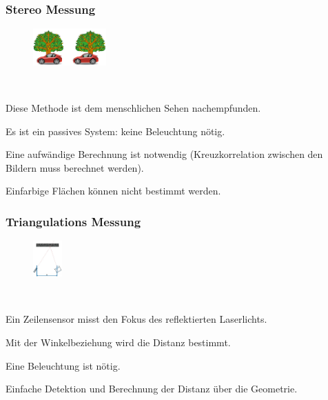 \newpage
\subsubsection{Stereo Messung}
\begin{figure}
    \centering
    \includegraphics[width=0.25\textwidth]{images/photonik_anwendung_stereo}
\end{figure}
\ 
\vspace{-5pt}
\begin{compactitem}
    \item Diese Methode ist dem menschlichen Sehen nachempfunden.
    \item Es ist ein passives System: keine Beleuchtung nötig.
    \item Eine aufwändige Berechnung ist notwendig (Kreuzkorrelation zwischen den Bildern muss berechnet werden).
    \item Einfarbige Flächen können nicht bestimmt werden.
\end{compactitem}

\subsubsection{Triangulations Messung}
\begin{figure}
    \centering
    \includegraphics[width=0.1\textwidth, angle=90]{images/photonik_anwendung_triangulation}
\end{figure}
\ 
\vspace{-5pt}
\begin{compactitem}
    \item Ein Zeilensensor misst den Fokus des reflektierten Laserlichts.
    \item Mit der Winkelbeziehung wird die Distanz bestimmt.
    \item Eine Beleuchtung ist nötig.
    \item Einfache Detektion und Berechnung der Distanz über die Geometrie.
\end{compactitem}

